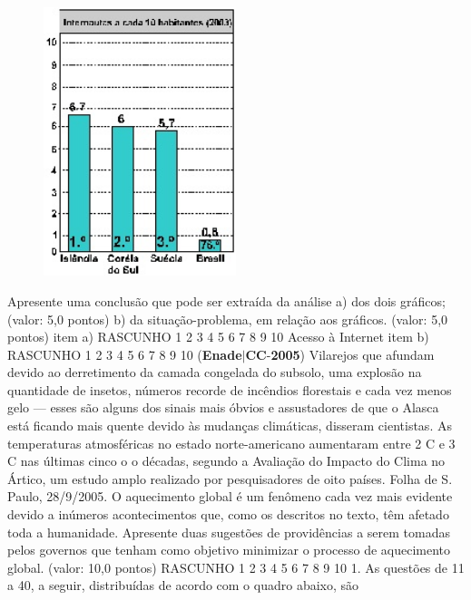 \documentclass{exam}
\begin{document}
\begin{questions}
\begin{figure}[H]
\begin{center}
	\end{center}
\end{figure}
\begin{figure}[H]
	\begin{center}
		\includegraphics[width=0.5\textwidth]{CIENCIA_DA_COMPUTACAO_Prova2005-utf8_figuras/fig-0008.jpg}
	\end{center}
\end{figure}
Apresente uma conclusão que pode ser extraída da análise
a) dos dois gráficos; (valor: 5,0 pontos)
b) da situação-problema, em relação aos gráficos. (valor: 5,0 pontos)
item a) RASCUNHO
1
2
3
4
5
6
7
8
9
10
Acesso à Internet
item b) RASCUNHO
1
2
3
4
5
6
7
8
9
10
\question (\textbf{Enade}$|$\textbf{CC}-\textbf{2005}) Vilarejos que afundam devido ao derretimento da camada congelada do subsolo, uma explosão na
quantidade de insetos, números recorde de incêndios florestais e cada vez menos gelo — esses são alguns dos
sinais mais óbvios e assustadores de que o Alasca está ficando mais quente devido às mudanças climáticas,
disseram cientistas.
As temperaturas atmosféricas no estado norte-americano aumentaram entre 2 C e 3 C nas últimas cinco
o o
décadas, segundo a Avaliação do Impacto do Clima no Ártico, um estudo amplo realizado por pesquisadores
de oito países.
Folha de S. Paulo, 28/9/2005.
O aquecimento global é um fenômeno cada vez mais evidente devido a inúmeros acontecimentos que, como os descritos no texto, têm
afetado toda a humanidade. Apresente duas sugestões de providências a serem tomadas pelos governos que tenham como objetivo
minimizar o processo de aquecimento global. (valor: 10,0 pontos)
RASCUNHO
1
2
3
4
5
6
7
8
9
10
1. As questões de 11 a 40, a seguir, distribuídas de acordo com o quadro abaixo, são

\end{questions}
\end{document}
